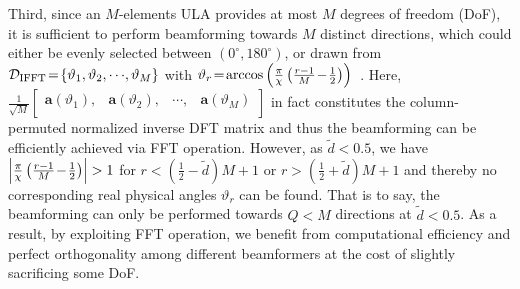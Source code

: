 \documentclass[12pt, draftclsnofoot, onecolumn]{IEEEtran}
\begin{document}
Third, since an $M$-elements ULA provides at most $M$ degrees of freedom (DoF), it is sufficient to perform beamforming towards $M$ distinct directions, which could either be evenly selected between $(0^\circ,180^\circ)$, or drawn from ${\mathcal{D}}_{{\rm{IFFT}}} \!=\! \left\{ {{\vartheta}_{1}}, {{\vartheta}_{2}}, \cdots\!, {{\vartheta}_{M}} \right\}$ with ${{\vartheta}_{r}} \!=\! {\rm{arccos}}\left( \frac{\rm{\pi}}{\chi} \left(\frac{r-1}{M} \!-\! \frac{1}{2} \right)\right)$~\cite{L_You2015TWC}. Here, $\frac{1}{\sqrt{M}} {{\left[ \begin{matrix}
   \mathbf{a}(\vartheta_1), & \mathbf{a}(\vartheta_2), & \cdots \!, & \mathbf{a}(\vartheta_M) \\
\end{matrix} \right]}}$ in fact constitutes the column-permuted normalized inverse DFT matrix and thus the beamforming can be efficiently achieved via FFT operation. However, as $\tilde{d}<0.5$, we have $\left| \frac{\rm{\pi}}{\chi} \left(\frac{r-1}{M} \!-\! \frac{1}{2} \right) \right| > 1$ for $r \!<\! \left(\frac{1}{2} \!-\! \tilde{d} \right)M\!+\!1$ or $r \!>\! \left(\frac{1}{2} \!+\! \tilde{d} \right)M\!+\!1$ and thereby no corresponding real physical angles ${{\vartheta}_{r}}$ can be found. That is to say, the beamforming can only be performed towards $Q\!<\!M$ directions at $\tilde{d}\!<\!0.5$. As a result, by exploiting FFT operation, we benefit from computational efficiency and perfect orthogonality among different beamformers at the cost of slightly sacrificing some DoF.
\end{document}
